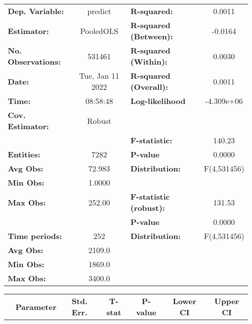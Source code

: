 \begin{center}
\begin{tabular}{lclc}
\toprule
\textbf{Dep. Variable:}    &      predict       & \textbf{  R-squared:         }   &      0.0011      \\
\textbf{Estimator:}        &     PooledOLS      & \textbf{  R-squared (Between):}  &     -0.0164      \\
\textbf{No. Observations:} &       531461       & \textbf{  R-squared (Within):}   &      0.0030      \\
\textbf{Date:}             &  Tue, Jan 11 2022  & \textbf{  R-squared (Overall):}  &      0.0011      \\
\textbf{Time:}             &      08:58:48      & \textbf{  Log-likelihood     }   &    -4.309e+06    \\
\textbf{Cov. Estimator:}   &       Robust       & \textbf{                     }   &                  \\
\textbf{}                  &                    & \textbf{  F-statistic:       }   &      140.23      \\
\textbf{Entities:}         &        7282        & \textbf{  P-value            }   &      0.0000      \\
\textbf{Avg Obs:}          &       72.983       & \textbf{  Distribution:      }   &   F(4,531456)    \\
\textbf{Min Obs:}          &       1.0000       & \textbf{                     }   &                  \\
\textbf{Max Obs:}          &       252.00       & \textbf{  F-statistic (robust):} &      131.53      \\
\textbf{}                  &                    & \textbf{  P-value            }   &      0.0000      \\
\textbf{Time periods:}     &        252         & \textbf{  Distribution:      }   &   F(4,531456)    \\
\textbf{Avg Obs:}          &       2109.0       & \textbf{                     }   &                  \\
\textbf{Min Obs:}          &       1869.0       & \textbf{                     }   &                  \\
\textbf{Max Obs:}          &       3400.0       & \textbf{                     }   &                  \\
\bottomrule
\end{tabular}
\begin{tabular}{lcccccc}
                & \textbf{Parameter} & \textbf{Std. Err.} & \textbf{T-stat} & \textbf{P-value} & \textbf{Lower CI} & \textbf{Upper CI}  \\

\end{tabular}
\end{center}
